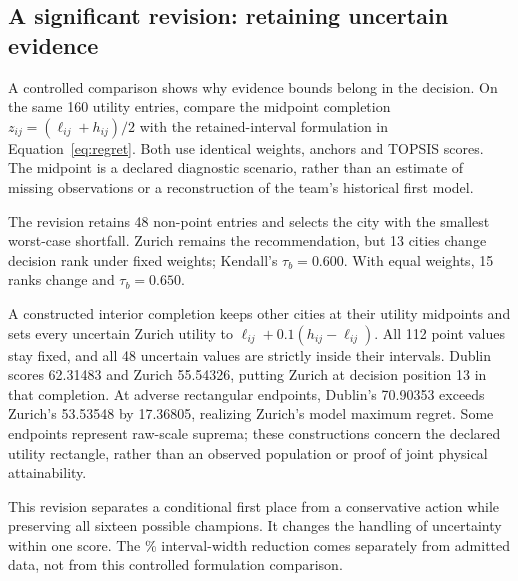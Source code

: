 \subsection{A significant revision: retaining uncertain evidence}
A controlled comparison shows why evidence bounds belong in the decision.
On the same 160 utility entries, compare the midpoint completion $z_{ij}=(\ell_{ij}+h_{ij})/2$ with the retained-interval formulation in Equation~\ref{eq:regret}. Both use identical weights, anchors and TOPSIS scores. The midpoint is a declared diagnostic scenario, rather than an estimate of missing observations or a reconstruction of the team's historical first model.

The revision retains 48 non-point entries and selects the city with the smallest worst-case shortfall. Zurich remains the recommendation, but 13 cities change decision rank under fixed weights; Kendall's $\tau_b=0.600$. With equal weights, 15 ranks change and $\tau_b=0.650$.

A constructed interior completion keeps other cities at their utility midpoints and sets every uncertain Zurich utility to $\ell_{ij}+0.1(h_{ij}-\ell_{ij})$. All 112 point values stay fixed, and all 48 uncertain values are strictly inside their intervals. Dublin scores 62.31483 and Zurich 55.54326, putting Zurich at decision position 13 in that completion. At adverse rectangular endpoints, Dublin's 70.90353 exceeds Zurich's 53.53548 by 17.36805, realizing Zurich's model maximum regret. Some endpoints represent raw-scale suprema; these constructions concern the declared utility rectangle, rather than an observed population or proof of joint physical attainability.

This revision separates a conditional first place from a conservative action while preserving all sixteen possible champions. It changes the handling of uncertainty within one score. The \TotalWidthReduction\% interval-width reduction comes separately from admitted data, not from this controlled formulation comparison.
